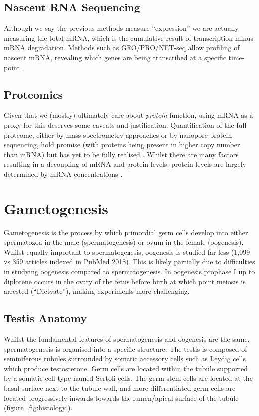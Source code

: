 \subsection{Nascent RNA Sequencing}
Although we say the previous methods measure ``expression'' we are actually measuring the total mRNA, which is the cumulative result of transcription minus mRNA degradation. Methods such as GRO/PRO/NET-seq allow profiling of nascent mRNA, revealing which genes are being transcribed at a specific time-point \parencite{Core2008Nascent, Churchman2011Nascent, Mahat2016Basepairresolution}.


\subsection{Proteomics}
Given that we (mostly) ultimately care about \emph{protein} function, using mRNA as a proxy for this deserves some caveats and justification. Quantification of the full proteome, either by mass-spectrometry approaches or by nanopore protein sequencing, hold promise (with proteins being present in higher copy number than mRNA) but has yet to be fully realised \parencite[Reviewed in][]{Specht2018Transformative,Marx2019dream}. Whilst there are many factors resulting in a decoupling of mRNA and protein levels, protein levels are largely determined by mRNA concentrations \parencite[Reviewed in][]{Liu2016Dependency}.






\section{Gametogenesis}
Gametogenesis is the process by which primordial germ cells develop into either spermatozoa in the male (spermatogenesis) or ovum in the female (oogenesis). Whilst equally important to spermatogenesis, oogenesis is studied far less (1,099 vs 359 articles indexed in PubMed 2018). This is likely partially due to difficulties in studying oogenesis compared to spermatogenesis. In oogenesis prophase I up to diplotene occurs in the ovary of the fetus before birth at which point meiosis is arrested (``Dictyate''), making experiments more challenging.

\subsection{Testis Anatomy}
Whilst the fundamental features of spermatogenesis and oogenesis are the same, spermatogenesis is organised into a specific structure. The testis is composed of seminiferous tubules surrounded by somatic accessory cells such as Leydig cells which produce testosterone. Germ cells are located within the tubule supported by a somatic cell type named Sertoli cells. The germ stem cells are located at the basal surface next to the tubule wall, and more differentiated germ cells are located progressively inwards towards the lumen/apical surface of the tubule (figure~\ref{fig:histology}).

